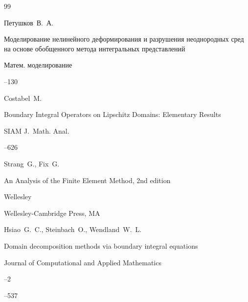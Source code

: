 \begin{thebibliography}{99}




\by Петушков~В.~А.

\paper Моделирование нелинейного деформирования и разрушения неоднородных сред на основе обобщенного метода интегральных представлений

\jour Матем. моделирование




--130






\by Costabel~M.

\paper  Boundary Integral Operators on Lipschitz Domains: Elementary Results 

\jour SIAM J.~Math. Anal.




--626





\by Strang~G., Fix~G.

\paper An Analysis of the Finite Element Method, 2nd edition

\publaddr Wellesley

\publ Wellesley-Cambridge Press, MA






\by Hsiao~G.~C., Steinbach~O.,  Wendland~W.~L.

\paper Domain decomposition methods via boundary integral equations

\jour Journal of Computational and Applied Mathematics



--2

--537


\end{thebibliography}
